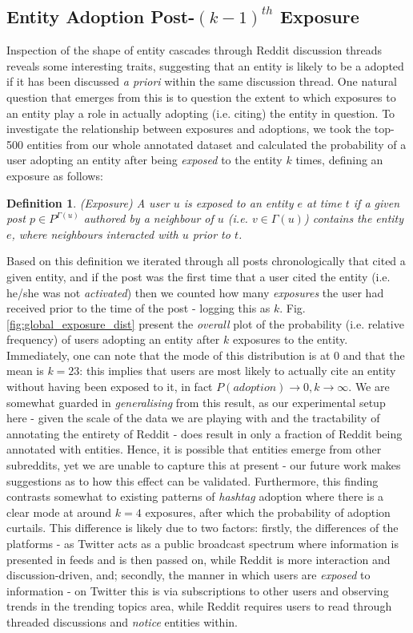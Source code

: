 \documentclass[review]{elsarticle}
\newtheorem{mydef}{Definition}
\begin{document}
\subsection{Entity Adoption Post-$({k-1})^{th}$ Exposure}
Inspection of the shape of entity cascades through Reddit discussion threads reveals some interesting traits, suggesting that an entity is likely to be a adopted if it has been discussed \emph{a priori} within the same discussion thread.
One natural question that emerges from this is to question the extent to which exposures to an entity play a role in actually adopting (i.e. citing) the entity in question.
To investigate the relationship between exposures and adoptions, we took the top-500 entities from our whole annotated dataset and calculated the probability of a user adopting an entity after being \emph{exposed} to the entity $k$ times, defining an exposure as follows:

\begin{mydef}
\label{def:exposure}
(Exposure) A user $u$ is exposed to an entity $e$ at time $t$ if a given post $p \in P^{\Gamma(u)}$ authored by a neighbour of $u$ (i.e. $v \in \Gamma(u)$) contains the entity $e$, where neighbours interacted with $u$ prior to $t$.
\end{mydef}

Based on this definition we iterated through all posts chronologically that cited a given entity, and if the post was the first time that a user cited the entity (i.e. he/she was not \emph{activated}) then we counted how many \emph{exposures} the user had received prior to the time of the post - logging this as $k$.
Fig. \ref{fig:global_exposure_dist} present the \emph{overall} plot of the probability (i.e. relative frequency) of users adopting an entity after $k$ exposures to the entity.
Immediately, one can note that the mode of this distribution is at $0$ and that the mean is $k=23$: this implies that users are most likely to actually cite an entity without having been exposed to it, in fact $P(adoption) \rightarrow 0, k \rightarrow \infty$.
We are somewhat guarded in \emph{generalising} from this result, as our experimental setup here - given the scale of the data we are playing with and the tractability of annotating the entirety of Reddit - does result in only a fraction of Reddit being annotated with entities.
Hence, it is possible that entities emerge from other subreddits, yet we are unable to capture this at present - our future work makes suggestions as to how this effect can be validated.
Furthermore, this finding contrasts somewhat to existing patterns of \emph{hashtag} adoption \cite{romero2011differences} where there is a clear mode at around $k=4$ exposures, after which the probability of adoption curtails.
This difference is likely due to two factors: firstly, the differences of the platforms - as Twitter acts as a public broadcast spectrum where information is presented in feeds and is then passed on, while Reddit is more interaction and discussion-driven, and; secondly, the manner in which users are \emph{exposed} to information - on Twitter this is via subscriptions to other users and observing trends in the trending topics area, while Reddit requires users to read through threaded discussions and \emph{notice} entities within.
\end{document}
